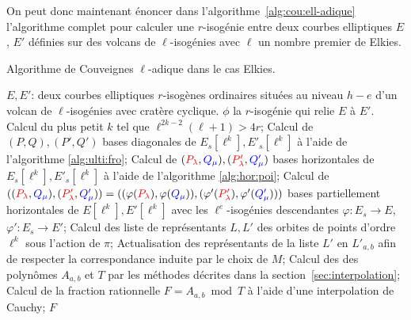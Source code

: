 \documentclass[10pt,a4paper]{book}
\theoremstyle{plain}
\theoremstyle{definition}
\theoremstyle{definition}
\theoremstyle{definition}
\theoremstyle{definition}
\theoremstyle{remark}
\theoremstyle{remark}
\theoremstyle{definition}
\begin{document}
On peut donc maintenant énoncer dans l'algorithme~\ref{alg:cou:ell-adique} 
l'algorithme complet  pour calculer une $r$-isogénie entre deux
courbes elliptiques $E$, $E'$ définies sur des volcans de $\ell$-isogénies avec
$\ell$ un nombre premier de Elkies. 

\begin{algorithm}
\caption{\label{alg:cou:ell-adique} Algorithme de Couveignes $\ell$-adique dans le cas Elkies.}
\begin{algorithmic}[1]
\REQUIRE $E,E'$: deux courbes elliptiques $r$-isogènes ordinaires situées au niveau $h-e$ d'un volcan de $\ell$-isogénies avec cratère cyclique.
\ENSURE $\phi$ la $r$-isogénie qui relie $E$ à $E'$.
\STATE Calcul du plus petit $k$ tel que $\ell^{2k-2}(\ell+1)>4r$;
\STATE  \label{alg:cou-ell:bdiag}
Calcul de $(P,Q),(P',Q')$ bases diagonales de $E_s[\ell^k],E'_s[\ell^k]$ à l'aide de l'algorithme \ref{alg:ulti:fro};
\STATE \label{alg:cou-ell:bhor}
Calcul de $(\color{red}P_{\lambda}\color{black},\color{blue}Q_{\mu}\color{black}),(\color{red}P'_{\lambda}\color{black},\color{blue}Q_{\mu}'\color{black})$ bases horizontales de $E_s[\ell^k],E'_s[\ell^k]$ à l'aide de l'algorithme \ref{alg:hor:poi};
\STATE Calcul de $((\color{red}P_{\lambda}\color{black},\color{blue}Q_{\mu}\color{black}),(\color{red}P'_{\lambda}\color{black},\color{blue}Q_{\mu}'\color{black}))=((\varphi(\color{red}P_{\lambda}\color{black}),\varphi(\color{blue}Q_{\mu}\color{black})),(\varphi'(\color{red}P'_{\lambda}\color{black}),\varphi'(\color{blue}Q_{\mu}'\color{black})))$ bases partiellement horizontales de $E[\ell^k],E'[\ell^k]$ avec les $\ell^e$-isogénies descendantes $\varphi: E_s \rightarrow E$, $\varphi': E_s \rightarrow E'$;
\ENDIF
\STATE \label{alg:cou-ell:rep} Calcul des liste de représentants $L,L'$ des orbites de points d'ordre $\ell^k$ sous l'action de $\pi$;
\STATE \label{alg:cou-ell:ord} Actualisation des représentants de la liste $L'$ en $L'_{a,b}$ afin de respecter la correspondance induite par le choix de $M$;
\STATE \label{alg:cou-ell:int} Calcul des des polynômes $A_{a,b}$ et $T$ par les méthodes décrites dans la section~\ref{sec:interpolation};
\STATE \label{alg:cou-ell:Cauchy} Calcul de la fraction rationnelle $F=A_{a,b} \bmod T$ à l'aide d'une interpolation de Cauchy;
\RETURN $F$
\ENDIF
\ENDFOR 
\end{algorithmic}
\end{algorithm}
\end{document}
